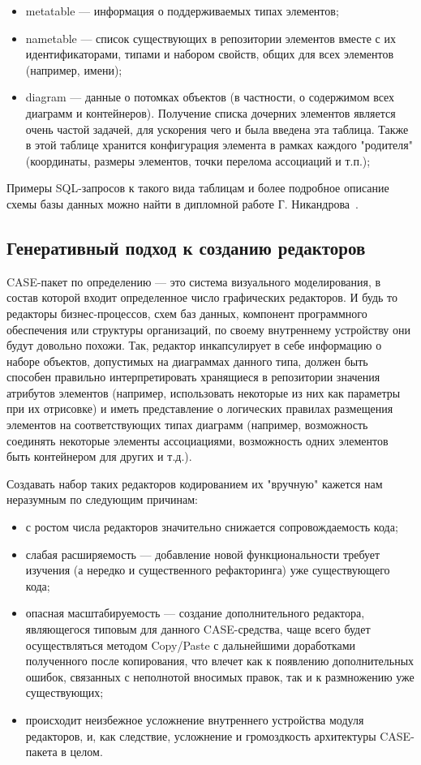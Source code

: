 \documentclass[a5paper]{article}
\begin{document}
\begin{itemize}
  \item metatable --- информация о поддерживаемых типах элементов;
  \item nametable --- список существующих в репозитории
	элементов вместе с их идентификаторами, типами и набором свойств, общих
	для всех элементов (например, имени);
  \item diagram --- данные о потомках объектов (в
	частности, о содержимом всех диаграмм и контейнеров). Получение списка
	дочерних элементов является очень частой задачей, для ускорения чего и
	была введена эта таблица. Также в этой таблице хранится конфигурация
	элемента в рамках каждого "родителя" (координаты, размеры элементов,
	точки перелома ассоциаций и т.п.);
\end{itemize}

Примеры SQL-запросов к такого вида таблицам
и более подробное описание схемы базы данных можно найти в дипломной
работе Г. Никандрова~\cite{nikandrov}.

\subsection{Генеративный подход к созданию редакторов}

CASE-пакет по определению --- это система
визуального моделирования, в состав которой входит определенное число
графических редакторов. И будь то редакторы бизнес-процессов, схем баз
данных, компонент программного обеспечения или структуры организаций,
по своему внутреннему устройству они будут довольно похожи. Так,
редактор инкапсулирует в себе информацию о наборе объектов, допустимых
на диаграммах данного типа, должен быть способен правильно
интерпретировать хранящиеся в репозитории значения атрибутов элементов
(например, использовать некоторые из них как параметры при их
отрисовке) и иметь представление о логических правилах размещения
элементов на соответствующих типах диаграмм (например, возможность
соединять некоторые элементы ассоциациями, возможность одних элементов
быть контейнером для других и т.д.).

Создавать набор таких редакторов кодированием их "вручную" кажется нам
неразумным по следующим причинам:

\begin{itemize}
  \item с ростом числа редакторов значительно снижается сопровождаемость кода;
  \item слабая расширяемость --- добавление новой функциональности требует
	изучения (а нередко и существенного рефакторинга) уже существующего
	кода;
  \item опасная масштабируемость --- создание дополнительного редактора,
	являющегося типовым для данного CASE-средства, чаще всего будет
	осуществляться методом Copy/Paste с
	дальнейшими доработками полученного после копирования, что влечет как к
	появлению дополнительных ошибок, связанных с неполнотой вносимых
	правок, так и к размножению уже существующих;
  \item происходит неизбежное усложнение внутреннего устройства модуля
	редакторов, и, как следствие, усложнение и громоздкость архитектуры
	CASE-пакета в целом.
\end{itemize}
\end{document}
